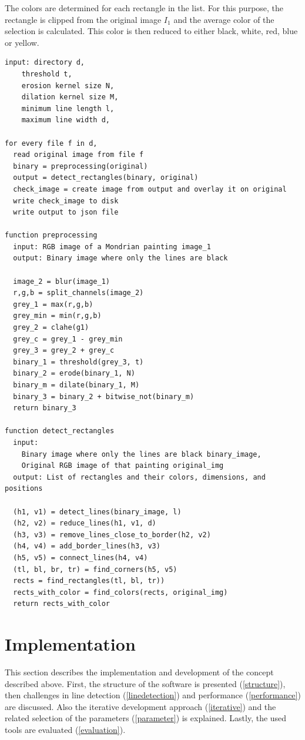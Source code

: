 \documentclass[serif,article,noparskip]{agse-thesis}
\begin{document}
The colors are determined for each rectangle in the list. For this purpose, the
rectangle is clipped from the original image $I_1$ and the average color of the
selection is calculated. This color is then reduced to either black, white, red,
blue or yellow.

\clearpage
\begin{lstlisting}[otherkeywords={function,input\:,output\:},label=lst:program,caption=Flow and structure of the program]
input: directory d,
    threshold t,
    erosion kernel size N,
    dilation kernel size M,
    minimum line length l,
    maximum line width d,

for every file f in d,
  read original image from file f
  binary = preprocessing(original)
  output = detect_rectangles(binary, original)
  check_image = create image from output and overlay it on original
  write check_image to disk
  write output to json file

function preprocessing
  input: RGB image of a Mondrian painting image_1
  output: Binary image where only the lines are black

  image_2 = blur(image_1)
  r,g,b = split_channels(image_2)
  grey_1 = max(r,g,b)
  grey_min = min(r,g,b)
  grey_2 = clahe(g1)
  grey_c = grey_1 - grey_min
  grey_3 = grey_2 + grey_c
  binary_1 = threshold(grey_3, t)
  binary_2 = erode(binary_1, N)
  binary_m = dilate(binary_1, M)
  binary_3 = binary_2 + bitwise_not(binary_m)
  return binary_3

function detect_rectangles
  input:
    Binary image where only the lines are black binary_image,
    Original RGB image of that painting original_img
  output: List of rectangles and their colors, dimensions, and positions

  (h1, v1) = detect_lines(binary_image, l)
  (h2, v2) = reduce_lines(h1, v1, d)
  (h3, v3) = remove_lines_close_to_border(h2, v2)
  (h4, v4) = add_border_lines(h3, v3)
  (h5, v5) = connect_lines(h4, v4)
  (tl, bl, br, tr) = find_corners(h5, v5)
  rects = find_rectangles(tl, bl, tr))
  rects_with_color = find_colors(rects, original_img)
  return rects_with_color
\end{lstlisting}

\section{Implementation} \label{implementation}

This section describes the implementation and development of the concept described
above. First, the structure of the software is presented (\ref{structure}),
then challenges in line detection (\ref{linedetection}) and performance
(\ref{performance}) are discussed. Also the iterative development approach
(\ref{iterative}) and the related selection of the parameters (\ref{parameter})
is explained. Lastly, the used tools are evaluated (\ref{evaluation}).
\end{document}
